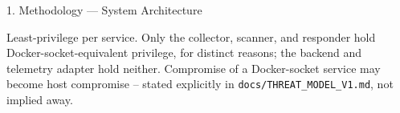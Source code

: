 \documentclass[aspectratio=169, 11pt]{beamer}
\begin{document}
\begin{frame}{1. Methodology --- System Architecture}
{}

\vspace{1mm}
{\scriptsize Least-privilege per service. Only the collector, scanner, and
responder hold Docker-socket-equivalent privilege, for distinct reasons; the
backend and telemetry adapter hold neither. Compromise of a Docker-socket
service may become host compromise -- stated explicitly in
\texttt{docs/THREAT\_MODEL\_V1.md}, not implied away.}
\end{frame}
\end{document}
